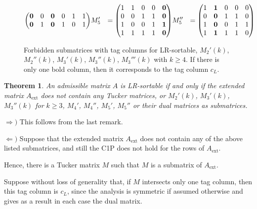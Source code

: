 \documentclass[a4paper,10pt]{report}
\theoremstyle{plain}
\newtheorem{teo}{Theorem}[chapter]
\theoremstyle{remark}
\theoremstyle{plain}
\newcommand*{\ext}{\mathrm{ext}}
\begin{document}
\begin{figure}[h!]
{\begin{align*}
\begin{pmatrix}
					\textbf 0 & 0 & \textbf 0 & 0 & 1 & 1 \\
					\textbf 0 & 1 & \textbf 0 & 1 & 0 & 1 \\
			\end{pmatrix}		
			&
			M_5' &= \begin{pmatrix}
					1 & 1 & 0 & 0 & \textbf 0 \\ 
					0 & 0 & 1 & 1 & \textbf 0 \\
					1 & 0 & 0 & 1 & \textbf 1 \\
					1 & 1 & 1 & 1 & \textbf 0 \\
			\end{pmatrix}
			&
			M_5'' &= \begin{pmatrix}
					1 & \textbf 1 & 0 & 0 & 0 \\ 
					0 & \textbf 0 & 1 & 1 & 0 \\
					1 & \textbf 0 & 0 & 1 & 1 \\
					1 & \textbf 1 & 1 & 1 & 0 \\
			\end{pmatrix}
	\end{align*}	
		}
	\caption{Forbidden submatrices with tag columns for LR-sortable, $M_{2}'(k)$, $M_{2}''(k)$, $M_{3}'(k)$, $M_{3}''(k)$, $M_{3}'''(k)$ with $k \geq 4$. If there is only one bold column, then it corresponds to the tag column $c_L$. }
\end{figure}

\begin{teo}
	An admissible matrix $A$ is LR-sortable if and only if the extended matrix $A_{\ext}$ does not contain any Tucker matrices, or $M_2'(k)$, $M_3'(k)$, $M_3''(k)$ for $k\geq 3$, $M_4'$, $M_4''$, $M_5'$, $M_5''$ or their dual matrices as submatrices.
\end{teo}

$\Rightarrow )$ This follows from the last remark.

$\Leftarrow )$ Suppose that the extended matrix $A_{\ext}$ does not contain any of the above listed submatrices, and still the C1P does not hold for the rows of $A_{\ext}$. 

Hence, there is a Tucker matrix $M$ such that $M$ is a submatrix of $A_{\ext}$.

Suppose without loss of generality that, if $M$ intersects only one tag column, then this tag column is $c_L$, since the analysis is symmetric if assumed otherwise and gives as a result in each case the dual matrix.
\end{document}
